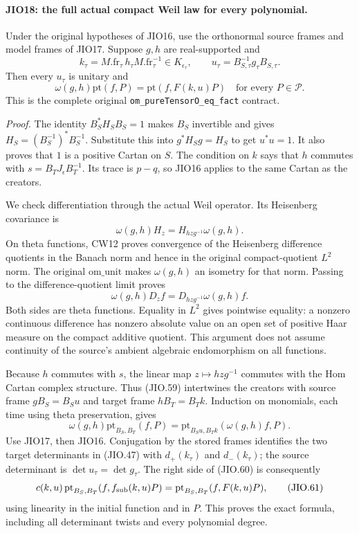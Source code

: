 \paragraph{JIO18: the full actual compact Weil law for every polynomial.}
\label{claim:JIO18}
Under the original hypotheses of JIO16, use the orthonormal
source frames and model frames of JIO17.  Suppose \(g,h\)
are real-supported and
\[
       k_\tau=M.\mathrm{fr}_\tau\,h_\tau M.\mathrm{fr}_\tau^{-1}
                         \in K_{\epsilon_\tau},\qquad
       u_\tau=B_{S,\tau}^{-1}g_\tau B_{S,\tau}.
 \tag{JIO.57}
\]
Then every \(u_\tau\) is unitary and
\[
             \omega(g,h)\mathrm{pt}(f,P)
                           =\mathrm{pt}(f,F(k,u)P)
                   \quad\text{for every }P\in\mathcal P.
 \tag{JIO.58}
\]
This is the complete original
\texttt{om\_pureTensorO\_eq\_fact} contract.

\emph{Proof.}
The identity \(B_S^*H_SB_S=1\) makes \(B_S\) invertible
and gives \(H_S=(B_S^{-1})^*B_S^{-1}\).
Substitute this into \(g^*H_Sg=H_S\) to get \(u^*u=1\).
It also proves that \(1\) is a positive Cartan on \(S\).
The condition on \(k\) says that \(h\) commutes with
\(s=B_TJ_\epsilon B_T^{-1}\).  Its trace is
\(p-q\), so JIO16 applies to the same Cartan as the creators.

We check differentiation through the actual Weil operator.
Its Heisenberg covariance is
\[
              \omega(g,h)H_z=H_{hzg^{-1}}\omega(g,h).
\]
On theta functions, CW12 proves convergence of the Heisenberg
difference quotients in the Banach norm and hence in the
original compact-quotient \(L^2\) norm.  The original
\(\mathrm{om\_unit}\) makes \(\omega(g,h)\) an isometry for
that norm.  Passing to the difference-quotient limit proves
\[
             \omega(g,h)D_zf
                            =D_{hzg^{-1}}\omega(g,h)f .
 \tag{JIO.59}
\]
Both sides are theta functions.  Equality in \(L^2\) gives
pointwise equality: a nonzero continuous difference has
nonzero absolute value on an open set of positive Haar
measure on the compact additive quotient.
This argument does not assume continuity of the source's
ambient algebraic endomorphism on all functions.

Because \(h\) commutes with \(s\), the linear map
\(z\mapsto hzg^{-1}\) commutes with the Hom Cartan complex
structure.  Thus (JIO.59) intertwines the creators with
source frame \(gB_S=B_Su\) and target frame \(hB_T=B_Tk\).
Induction on monomials, each time using theta preservation,
gives
\[
 \omega(g,h)\mathrm{pt}_{B_S,B_T}(f,P)
              =\mathrm{pt}_{B_Su,B_Tk}(\omega(g,h)f,P).
 \tag{JIO.60}
\]
Use JIO17, then JIO16.  Conjugation by the stored frames
identifies the two target determinants in (JIO.47) with
\(d_+(k_\tau)\) and \(d_-(k_\tau)\); the source determinant
is \(\det u_\tau=\det g_\tau\).
The right side of (JIO.60) is consequently
\[
          c(k,u)\,\mathrm{pt}_{B_S,B_T}
                              (f,f_{\rm sub}(k,u)P)
                         =\mathrm{pt}_{B_S,B_T}(f,F(k,u)P),
 \tag{JIO.61}
\]
using linearity in the initial function and in \(P\).
This proves the exact formula, including all determinant
twists and every polynomial degree.


